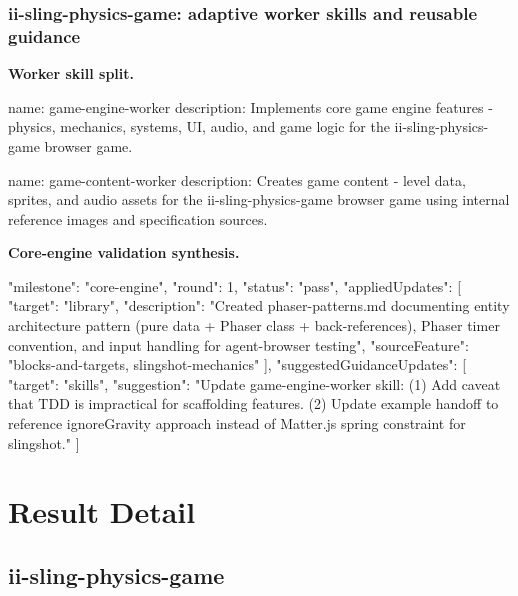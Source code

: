\documentclass[11pt,a4paper]{article}
\begin{document}
\subsubsection{ii-sling-physics-game: adaptive worker skills and reusable guidance}

\textbf{Worker skill split.}

\begin{cbox}
name: game-engine-worker
description: Implements core game engine features - physics, mechanics, systems,
  UI, audio, and game logic for the ii-sling-physics-game browser game.
\end{cbox}

\begin{cbox}
name: game-content-worker
description: Creates game content - level data, sprites, and audio assets for the
  ii-sling-physics-game browser game using internal reference images and specification sources.
\end{cbox}

\textbf{Core-engine validation synthesis.}

\begin{cbox}
{
  "milestone": "core-engine",
  "round": 1,
  "status": "pass",
  "appliedUpdates": [
    { "target": "library",
      "description": "Created phaser-patterns.md documenting entity architecture pattern (pure data + Phaser class + back-references), Phaser timer convention, and input handling for agent-browser testing",
      "sourceFeature": "blocks-and-targets, slingshot-mechanics" }
  ],
  "suggestedGuidanceUpdates": [
    { "target": "skills",
      "suggestion": "Update game-engine-worker skill: (1) Add caveat that TDD is impractical for scaffolding features. (2) Update example handoff to reference ignoreGravity approach instead of Matter.js spring constraint for slingshot." }
  ]
}
\end{cbox}

\clearpage
\section{Result Detail}

\subsection*{ii-sling-physics-game}
\end{document}
